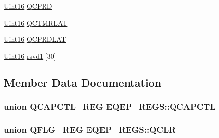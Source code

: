 \begin{DoxyCompactItemize}
\item 
\hyperlink{_d_s_p2833x___device_8h_a59a9f6be4562c327cbfb4f7e8e18f08b}{Uint16} \hyperlink{struct_e_q_e_p___r_e_g_s_a5efb145522ba6915a07b7b8e6a40714a}{Q\+C\+P\+R\+D}
\item 
\hyperlink{_d_s_p2833x___device_8h_a59a9f6be4562c327cbfb4f7e8e18f08b}{Uint16} \hyperlink{struct_e_q_e_p___r_e_g_s_ab0bf278f6774d2c6e321e84afbd9ac42}{Q\+C\+T\+M\+R\+L\+A\+T}
\item 
\hyperlink{_d_s_p2833x___device_8h_a59a9f6be4562c327cbfb4f7e8e18f08b}{Uint16} \hyperlink{struct_e_q_e_p___r_e_g_s_a09a27a8ca2cdacda92dcf682dbf65faf}{Q\+C\+P\+R\+D\+L\+A\+T}
\item 
\hyperlink{_d_s_p2833x___device_8h_a59a9f6be4562c327cbfb4f7e8e18f08b}{Uint16} \hyperlink{struct_e_q_e_p___r_e_g_s_a3a86a2aa28b8a1a9815a7b1aa0941051}{rsvd1} \mbox{[}30\mbox{]}
\end{DoxyCompactItemize}


\subsection{Member Data Documentation}
\hypertarget{struct_e_q_e_p___r_e_g_s_a9d4b27278a621aad04be4039f59b0612}{}
\subsubsection[{Q\+C\+A\+P\+C\+T\+L}]{\setlength{\rightskip}{0pt plus 5cm}union {\bf Q\+C\+A\+P\+C\+T\+L\+\_\+\+R\+E\+G} E\+Q\+E\+P\+\_\+\+R\+E\+G\+S\+::\+Q\+C\+A\+P\+C\+T\+L}\label{struct_e_q_e_p___r_e_g_s_a9d4b27278a621aad04be4039f59b0612}
\hypertarget{struct_e_q_e_p___r_e_g_s_a7114f2e5d0a7d2be1bd4b6ed8aea9988}{}
\subsubsection[{Q\+C\+L\+R}]{\setlength{\rightskip}{0pt plus 5cm}union {\bf Q\+F\+L\+G\+\_\+\+R\+E\+G} E\+Q\+E\+P\+\_\+\+R\+E\+G\+S\+::\+Q\+C\+L\+R}\label{struct_e_q_e_p___r_e_g_s_a7114f2e5d0a7d2be1bd4b6ed8aea9988}
\hypertarget{struct_e_q_e_p___r_e_g_s_a5efb145522ba6915a07b7b8e6a40714a}{}
